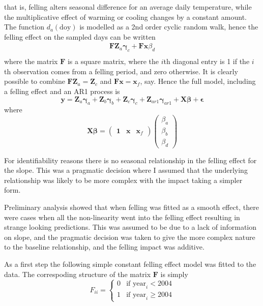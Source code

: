 that is, felling alters seasonal difference for an average daily temperature, while the multiplicative effect of warming or cooling changes by a constant amount.  The function $d_a(\text{doy})$ is modelled as a 2nd order cyclic random walk, hence the felling effect on the sampled days can be written
\begin{align}
  \bm{F} \bm{Z}_a \bm{\gamma}_c + \bm{F} \bm{x} \beta_d \\
\end{align}
where the matrix $\bm{F}$ is a square matrix, where the $i$th diagonal entry is 1 if the $i$th observation comes from a felling period, and zero otherwise.  It is clearly possible to combine $\bm{F} \bm{Z}_a = \bm{Z}_c$ and $\bm{F} \bm{x} = \bm{x}_f$, say.  Hence the full model, including a felling effect and an AR1 process is
\begin{equation}
  \bm{y} = \bm{Z}_a \bm{\gamma}_a + \bm{Z}_b \bm{\gamma}_b + \bm{Z}_c \bm{\gamma}_c + \bm{Z}_{ar1} \bm{\gamma}_{ar1} + \bm{X} \bm{\beta} + \bm{\epsilon}
\end{equation}
where
\begin{equation}
  \bm{X} \bm{\beta} = \begin{pmatrix} \bm{1} & \bm{x} & \bm{x}_f \end{pmatrix} \begin{pmatrix} \beta_a \\ \beta_b \\ \beta_d \end{pmatrix} 
\end{equation}

For identifiability reasons there is no seasonal relationship in the felling effect for the slope.  This was a pragmatic decision where I assumed that the underlying relationship was likely to be more complex with the impact taking a simpler form.

Preliminary analysis showed that when felling was fitted as a smooth effect, there were cases when all the non-linearity went into the felling effect resulting in strange looking predictions.  This was assumed to be due to a lack of information on slope, and the pragmatic decision was taken to give the more complex nature to the baseline relationship, and the felling impact was additive.

As a first step the following simple constant felling effect model was fitted to the data. The correspoding structure of the matrix $\bm{F}$ is simply
\begin{equation}
F_{ii} =
  \begin{cases}
   0 & \text{if } \text{year}_i < 2004 \\
   1 & \text{if } \text{year}_i \geq 2004 
  \end{cases}
\end{equation}

